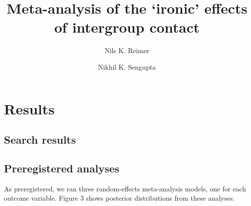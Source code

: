 \documentclass[
]{article}
\title{Meta-analysis of the `ironic' effects of intergroup contact}
\author{Nils K. Reimer \and Nikhil K. Sengupta}
\date{}
\begin{document}
\maketitle

\hypertarget{results}{%
\section{Results}\label{results}}

\hypertarget{search-results}{%
\subsection{Search results}\label{search-results}}

\hypertarget{preregistered-analyses}{%
\subsection{Preregistered analyses}\label{preregistered-analyses}}

As preregistered, we ran three random-effects meta-analysis models, one
for each outcome variable. Figure 3 shows posterior distributions from
these analyses.
\end{document}
